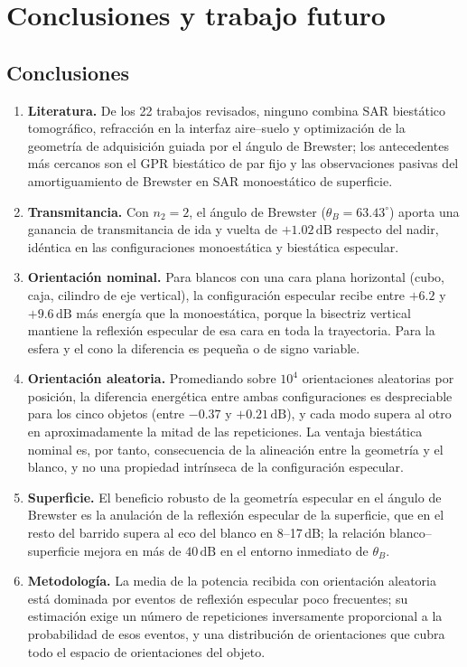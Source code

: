 \documentclass[11pt,a4paper]{report}
\newcommand{\dB}{\,\mathrm{dB}}
\begin{document}
\chapter{Conclusiones y trabajo futuro}
\label{cap:conclusiones}

\section{Conclusiones}

\begin{enumerate}[itemsep=4pt]
  \item \textbf{Literatura.} De los 22 trabajos revisados, ninguno combina
  SAR biestático tomográfico, refracción en la interfaz aire--suelo y
  optimización de la geometría de adquisición guiada por el ángulo de
  Brewster; los antecedentes más cercanos son el GPR biestático de par fijo
  y las observaciones pasivas del amortiguamiento de Brewster en SAR
  monoestático de superficie.

  \item \textbf{Transmitancia.} Con $n_2=2$, el ángulo de Brewster
  ($\theta_B=63.43^\circ$) aporta una ganancia de transmitancia de ida y
  vuelta de $+1.02\dB$ respecto del nadir, idéntica en las configuraciones
  monoestática y biestática especular.

  \item \textbf{Orientación nominal.} Para blancos con una cara plana
  horizontal (cubo, caja, cilindro de eje vertical), la configuración
  especular recibe entre $+6.2$ y $+9.6\dB$ más energía que la monoestática,
  porque la bisectriz vertical
  mantiene la reflexión especular de esa cara en toda la trayectoria. Para
  la esfera y el cono la diferencia es pequeña o de signo variable.

  \item \textbf{Orientación aleatoria.} Promediando sobre $10^4$
  orientaciones aleatorias por posición, la diferencia energética entre
  ambas configuraciones es despreciable para los cinco objetos (entre
  $-0.37$ y $+0.21\dB$), y cada modo supera al otro en aproximadamente la
  mitad de las repeticiones. La ventaja biestática nominal es, por tanto,
  consecuencia de la alineación entre la geometría y el blanco, y no una
  propiedad intrínseca de la configuración especular.

  \item \textbf{Superficie.} El beneficio robusto de la geometría especular
  en el ángulo de Brewster es la anulación de la reflexión especular de la
  superficie, que en el resto del barrido supera al eco del blanco en
  8--17\,dB; la relación blanco--superficie mejora en más de $40\dB$ en el
  entorno inmediato de $\theta_B$.

  \item \textbf{Metodología.} La media de la potencia recibida con
  orientación aleatoria está dominada por eventos de reflexión especular
  poco frecuentes; su estimación exige un número de repeticiones
  inversamente proporcional a la probabilidad de esos eventos, y una
  distribución de orientaciones que cubra todo el espacio de orientaciones
  del objeto.
\end{enumerate}
\end{document}
